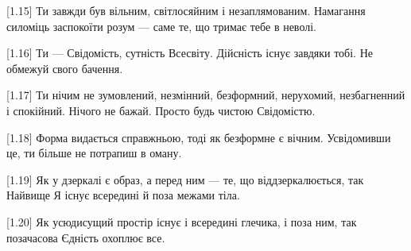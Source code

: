[1.15] Ти завжди був вільним, світлосяйним і незаплямованим. Намагання силоміць заспокоїти розум --- саме те, що тримає тебе в неволі.

[1.16] Ти --- Свідомість, сутність Всесвіту. Дійсність існує завдяки тобі. Не обмежуй свого бачення.

[1.17] Ти нічим не зумовлений, незмінний, безформний, нерухомий, незбагненний і спокійний. Нічого не бажай. Просто будь чистою Свідомістю.

[1.18] Форма видається справжньою, тоді як безформне є вічним. Усвідомивши це, ти більше не потрапиш в оману.

[1.19] Як у дзеркалі є образ, а перед ним --- те, що віддзеркалюється, так Найвище Я існує всередині й поза межами тіла.

[1.20] Як усюдисущий простір існує і всередині глечика, і поза ним, так позачасова Єдність охоплює все.
